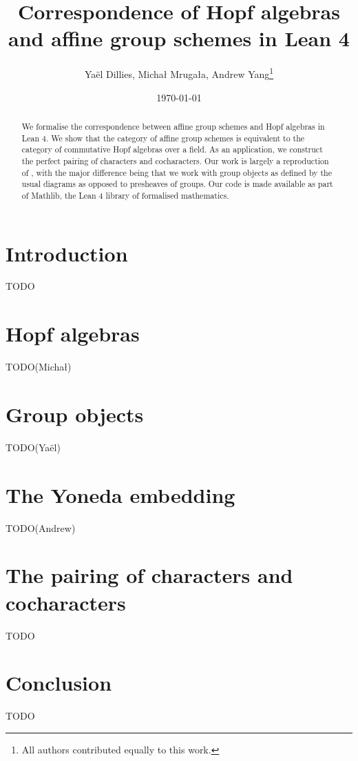 \documentclass{article}
\title{Correspondence of Hopf algebras and affine group schemes in Lean 4}
\author{Yaël Dillies, Michał Mrugała, Andrew Yang\footnote{All authors contributed equally to this work.}}
\date{\today}
\begin{document}
\maketitle


\begin{abstract}
  We formalise the correspondence between affine group schemes and Hopf algebras in Lean 4.
  We show that the category of affine group schemes is equivalent to the category of commutative Hopf algebras over a field.
  As an application, we construct the perfect pairing of characters and cocharacters.
  Our work is largely a reproduction of \cite{CrazyAffine}, with the major difference being that we work with group objects as defined by the usual diagrams as opposed to presheaves of groups.
  Our code is made available as part of Mathlib, the Lean 4 library of formalised mathematics.
\end{abstract}


\section{Introduction}\label{sec:intro}


TODO


\section{Hopf algebras}\label{sec:hopf}


TODO(Michał)


\section{Group objects}\label{sec:grp}


TODO(Yaël)


\section{The Yoneda embedding}\label{sec:yoneda}


TODO(Andrew)


\section{The pairing of characters and cocharacters}\label{sec:char-cochar}


TODO


\section{Conclusion}\label{sec:conclusion}


TODO




\end{document}
